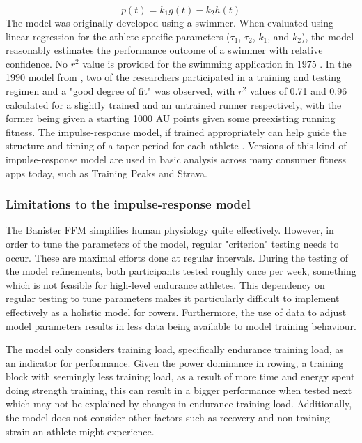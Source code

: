 \begin{equation}\label{eq:ban_perf}
  p(t) = k_1g(t)-k_2h(t)
\end{equation}
The model was originally developed using a swimmer. When evaluated using linear regression for the athlete-specific parameters ($\tau_1$, $\tau_2$, $k_1$, and $k_2$), the model reasonably estimates the performance outcome of a swimmer with relative confidence. No $r^2$ value is provided for the swimming application in 1975 \cite{Bannister1976}. In the 1990 model from \textcite{Morton1990}, two of the researchers participated in a training and testing regimen and a "good degree of fit" was observed, with $r^2$ values of 0.71 and 0.96 calculated for a slightly trained and an untrained runner respectively, with the former being given a starting 1000 AU points given some preexisting running fitness. The impulse-response model, if trained appropriately can help guide the structure and timing of a taper period for each athlete \cite{Morton1990}.
Versions of this kind of impulse-response model are used in basic analysis across many consumer fitness apps today, such as Training Peaks and Strava.

\subsubsection{Limitations to the impulse-response model}
The Banister FFM simplifies human physiology quite effectively. However, in order to tune the parameters of the model, regular "criterion" testing needs to occur. These are maximal efforts done at regular intervals. During the testing of the \textcite{Morton1990} model refinements, both participants tested roughly once per week, something which is not feasible for high-level endurance athletes. This dependency on regular testing to tune parameters makes it particularly difficult to implement effectively as a holistic model for rowers. Furthermore, the use of data to adjust model parameters results in less data being available to model training behaviour.

The model only considers training load, specifically endurance training load, as an indicator for performance. Given the power dominance in rowing, a training block with seemingly less training load, as a result of more time and energy spent doing strength training, this can result in a bigger performance when tested next which may not be explained by changes in endurance training load. Additionally, the model does not consider other factors such as recovery and non-training strain an athlete might experience.

